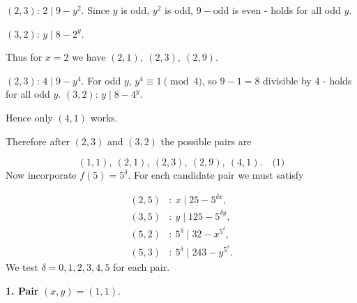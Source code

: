 \((2,3)\): \(2\mid 9-y^{2}\). Since \(y\) is odd, \(y^{2}\) is odd, \(9-\text{odd}\) is even - holds for all odd \(y\).\par
\((3,2)\): \(y\mid 8-2^{y}\).\par
{}
Thus for \(x=2\) we have \((2,1),\ (2,3),\ (2,9)\).\par
{}
\((2,3)\): \(4\mid 9-y^{4}\). For odd \(y\), \(y^{4}\equiv1\pmod4\), so \(9-1=8\) divisible by 4 - holds for all odd \(y\). \((3,2)\): \(y\mid 8-4^{y}\).\par
{}
Hence only \((4,1)\) works.\par
Therefore after \((2,3)\) and \((3,2)\) the possible pairs are\par
\[
(1,1),\ (2,1),\ (2,3),\ (2,9),\ (4,1). \quad\text{(1)}
\]
Now incorporate \(f(5)=5^{\delta}\). For each candidate pair we must satisfy\par
\[
\begin{aligned}
(2,5)&:\ x\mid 25-5^{\delta x},\\
(3,5)&:\ y\mid 125-5^{\delta y},\\
(5,2)&:\ 5^{\delta}\mid 32 - x^{5^{\delta}},\\
(5,3)&:\ 5^{\delta}\mid 243 - y^{5^{\delta}}.
\end{aligned}
\]
We test \(\delta=0,1,2,3,4,5\) for each pair.\par
\smallskip
\textbf{1. Pair }\((x,y)=(1,1)\).\textbf{}\par
{}
